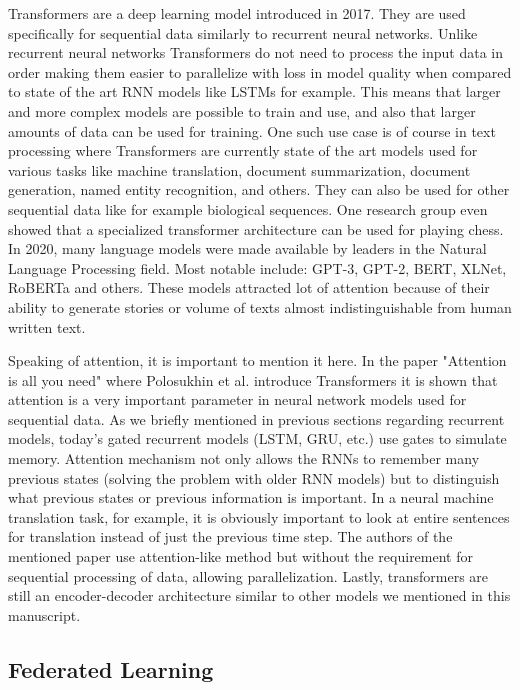 \documentclass[b5paper]{book}
\let\cite\parencite
\begin{document}
Transformers are a deep learning model introduced in 2017. \cite{vaswani2017attention} They are used specifically for sequential data similarly to recurrent neural networks. Unlike recurrent neural networks Transformers do not need to process the input data in order making them easier to parallelize with loss in model quality when compared to state of the art RNN models like LSTMs for example. This means that larger and more complex models are possible to train and use, and also that larger amounts of data can be used for training. One such use case is of course in text processing where Transformers are currently state of the art models used for various tasks like machine translation, document summarization, document generation, named entity recognition, and others. They can also be used for other sequential data like for example biological sequences. One research group even showed that a specialized transformer architecture can be used for playing chess. In 2020, many language models were made available by leaders in the Natural Language Processing field. Most notable include: GPT-3, GPT-2, BERT, XLNet, RoBERTa and others. These models attracted lot of attention because of their ability to generate stories or volume of texts almost indistinguishable from human written text. 

Speaking of attention, it is important to mention it here. In the paper "Attention is all you need" \cite{vaswani2017attention} where Polosukhin et al. introduce Transformers it is shown that attention is a very important parameter in neural network models used for sequential data. As we briefly mentioned in previous sections regarding recurrent models, today's gated recurrent models (LSTM, GRU, etc.) use gates to simulate memory. Attention mechanism not only allows the RNNs to remember many previous states (solving the problem with older RNN models) but to distinguish what previous states or previous information is important. In a neural machine translation task, for example, it is obviously important to look at entire sentences for translation instead of just the previous time step. The authors of the mentioned paper use attention-like method but without the requirement for sequential processing of data, allowing parallelization. Lastly, transformers are still an encoder-decoder architecture similar to other models we mentioned in this manuscript.


\subsection{Federated Learning}
\end{document}

